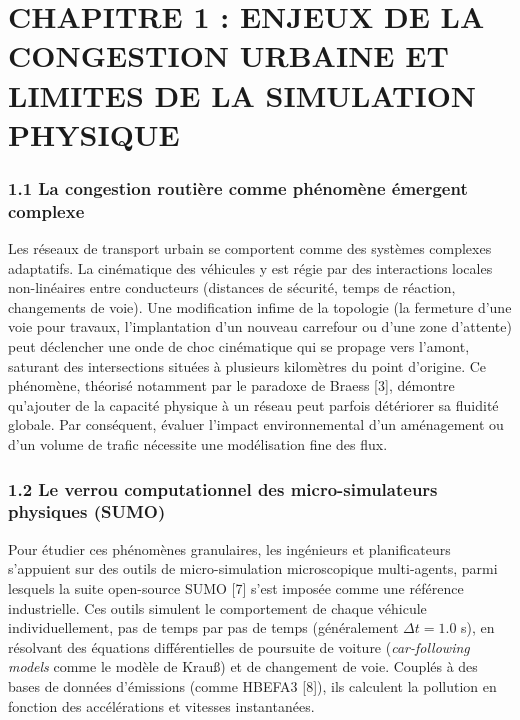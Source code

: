 \documentclass[10pt, a4paper]{article}
\begin{document}
\newpage

\section{CHAPITRE 1 : ENJEUX DE LA CONGESTION URBAINE ET LIMITES DE LA
SIMULATION
PHYSIQUE}\label{chapitre-1-enjeux-de-la-congestion-urbaine-et-limites-de-la-simulation-physique}

\subsubsection{1.1 La congestion routière comme phénomène émergent
complexe}\label{la-congestion-routiuxe8re-comme-phuxe9nomuxe8ne-uxe9mergent-complexe}

Les réseaux de transport urbain se comportent comme des systèmes
complexes adaptatifs. La cinématique des véhicules y est régie par des
interactions locales non-linéaires entre conducteurs (distances de
sécurité, temps de réaction, changements de voie). Une modification
infime de la topologie (la fermeture d'une voie pour travaux,
l'implantation d'un nouveau carrefour ou d'une zone d'attente) peut
déclencher une onde de choc cinématique qui se propage vers l'amont,
saturant des intersections situées à plusieurs kilomètres du point
d'origine. Ce phénomène, théorisé notamment par le paradoxe de Braess
{[}3{]}, démontre qu'ajouter de la capacité physique à un réseau peut
parfois détériorer sa fluidité globale. Par conséquent, évaluer l'impact
environnemental d'un aménagement ou d'un volume de trafic nécessite une
modélisation fine des flux.

\subsubsection{1.2 Le verrou computationnel des micro-simulateurs
physiques
(SUMO)}\label{le-verrou-computationnel-des-micro-simulateurs-physiques-sumo}

Pour étudier ces phénomènes granulaires, les ingénieurs et
planificateurs s'appuient sur des outils de micro-simulation
microscopique multi-agents, parmi lesquels la suite open-source SUMO
{[}7{]} s'est imposée comme une référence industrielle. Ces outils
simulent le comportement de chaque véhicule individuellement, pas de
temps par pas de temps (généralement \(\Delta t = 1.0\) s), en résolvant
des équations différentielles de poursuite de voiture
(\emph{car-following models} comme le modèle de Krauß) et de changement
de voie. Couplés à des bases de données d'émissions (comme HBEFA3
{[}8{]}), ils calculent la pollution en fonction des accélérations et
vitesses instantanées.
\end{document}
